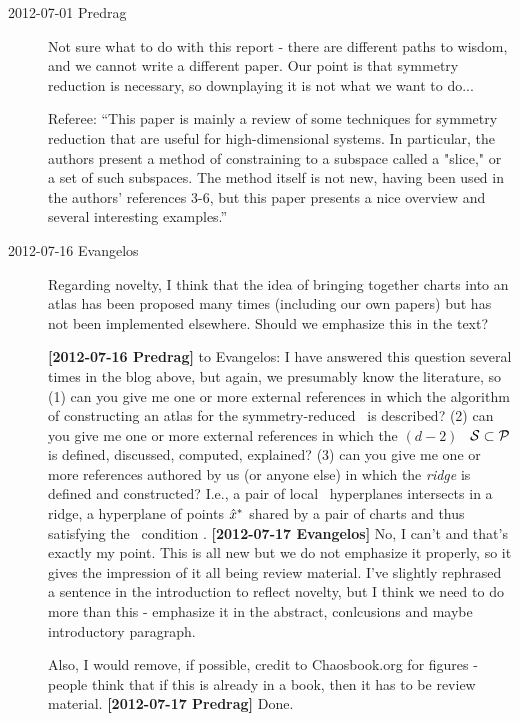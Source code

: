 \begin{description}

\item[2012-07-01 Predrag] Not sure what to do with this report -
there are different paths to wisdom, and we cannot
write a different paper. Our point is that symmetry reduction is
necessary, so downplaying it is not what we want to do...

\bigskip

Referee: ``This paper is mainly a review of some techniques for symmetry reduction
that are useful for high-dimensional systems. In particular, the authors
present a method of constraining to a subspace called a "slice," or a set
of such subspaces. The method itself is not new, having been used in the
authors' references 3-6, but this paper presents a nice overview and
several interesting examples.''

\item[2012-07-16 Evangelos]
	Regarding novelty, I think that the idea of bringing together
	charts into an atlas has been proposed many times (including our
	own papers) but has not been implemented elsewhere. Should we
	emphasize this in the text?

{\bf [2012-07-16 Predrag]} to Evangelos: I have answered this question
several times in the blog above, but again, we presumably know the
literature, so
(1) can you give me one or more external references in which the
algorithm of constructing an atlas for the symmetry-reduced \statesp\ is
described?
(2) can you give me one or more external references in which the
$(d\!-\!2)$\dmn\ \emph{\poincBord} ${\cal S} \subset {\cal P}$ is defined,
discussed, computed, explained?
(3) can you give me one or more references authored by us (or anyone
else) in which the \emph{ridge} is defined and constructed? I.e., a pair
of  local \slice\ hyperplanes intersects in a
{ridge}, a  hyperplane {\PoincS} of points
$\hat{x}^*$ shared by a pair of charts and thus satisfying the \slice\
condition .
{\bf [2012-07-17 Evangelos]} No, I can't and
that's exactly my point. This is all new but we do not emphasize it
properly, so it gives the impression of it all being review material.
I've slightly rephrased a sentence in the introduction to reflect novelty,
but I think we need to do more than this - emphasize it in the abstract,
conlcusions and maybe introductory paragraph.

Also, I would remove, if possible, credit to Chaosbook.org for figures -
people think that if this is already in a book, then it has to be review
material.
 {\bf [2012-07-17 Predrag]} Done.



\end{description}
